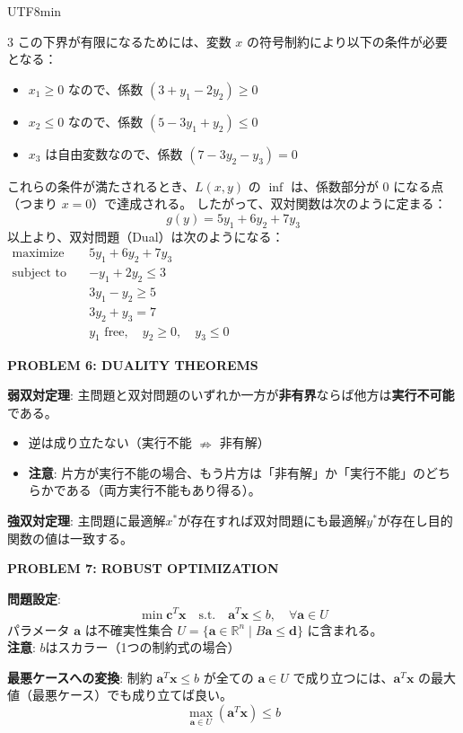 \documentclass[8pt,a4paper]{article}
\newcommand{\mysection}[1]{\vspace{2pt}\textbf{#1}\vspace{1pt}}
\begin{document}
\begin{CJK}{UTF8}{min}
\begin{multicols}{3}
この下界が有限になるためには、変数 $x$ の符号制約により以下の条件が必要となる：
\begin{itemize}
    \item $x_1 \geq 0$ なので、係数 $(3 + y_1 - 2y_2) \geq 0$
    \item $x_2 \leq 0$ なので、係数 $(5 - 3y_1 + y_2) \leq 0$
    \item $x_3$ は自由変数なので、係数 $(7 - 3y_2 - y_3) = 0$
\end{itemize}
これらの条件が満たされるとき、$L(x,y)$ の $\inf$ は、係数部分が 0 になる点（つまり $x=0$）で達成される。
したがって、双対関数は次のように定まる：
\[
g(y) = 5y_1 + 6y_2 + 7y_3
\]
以上より、双対問題（Dual）は次のようになる：
$\begin{aligned}
\text{maximize} \quad & 5y_1 + 6y_2 + 7y_3 \\
\text{subject to} \quad & -y_1 + 2y_2 \leq 3 \\
& 3y_1 - y_2 \geq 5 \\
& 3y_2 + y_3 = 7 \\
& y_1 \text{ free}, \quad y_2 \geq 0, \quad y_3 \leq 0
\end{aligned}$

\mysection{PROBLEM 6: DUALITY THEOREMS}

\textbf{弱双対定理}: 主問題と双対問題のいずれか一方が\textbf{非有界}ならば他方は\textbf{実行不可能}である。
\begin{itemize}
    \item 逆は成り立たない（実行不能 $\nRightarrow$ 非有解）
    \item \textbf{注意}: 片方が実行不能の場合、もう片方は「非有解」か「実行不能」のどちらかである（両方実行不能もあり得る）。
\end{itemize}

\textbf{強双対定理}: 主問題に最適解$x^*$が存在すれば双対問題にも最適解$y^*$が存在し目的関数の値は一致する。

\mysection{PROBLEM 7: ROBUST OPTIMIZATION}

\textbf{問題設定}:
\[
\min \boldsymbol{c}^T \boldsymbol{x} \quad \text{s.t.} \quad \boldsymbol{a}^T \boldsymbol{x} \leq b, \quad \forall \boldsymbol{a} \in U
\]
パラメータ $\boldsymbol{a}$ は不確実性集合 $U = \{\boldsymbol{a} \in \mathbb{R}^n \mid B\boldsymbol{a} \leq \boldsymbol{d}\}$ に含まれる。\\
\textbf{注意}: $b$はスカラー（1つの制約式の場合）

\textbf{最悪ケースへの変換}:
制約 $\boldsymbol{a}^T \boldsymbol{x} \leq b$ が全ての $\boldsymbol{a} \in U$ で成り立つには、$\boldsymbol{a}^T \boldsymbol{x}$ の最大値（最悪ケース）でも成り立てば良い。
\[
\max_{\boldsymbol{a} \in U} (\boldsymbol{a}^T \boldsymbol{x}) \leq b
\]


\end{multicols}
\end{CJK}
\end{document}
